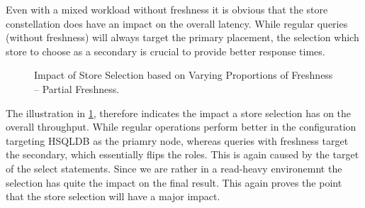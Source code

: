 Even with a mixed workload without freshness it is obvious that the store constellation does have an impact on the overall latency.
While regular queries (without freshness) will always target the primary placement, the selection which store to choose as a secondary
is crucial to provide better response times.\\


\begin{figure}[t] 
    \centering 
    \caption{Impact of Store Selection based on Varying Proportions of Freshness -- Partial Freshness.}
    \label{fig:mixed}
\end{figure}

The illustration in \ref{fig:mixed}, therefore indicates the impact a store selection has on the overall throughput.
While regular operations perform better in the configuration targeting HSQLDB as the priamry node,
whereas queries with freshness target the secondary, which essentially flips the roles.
This is again caused by the target of the select statements. 
Since we are rather in a read-heavy environemnt the selection has quite the impact on the final result.
This again proves the point that the store selection will have a major impact.


